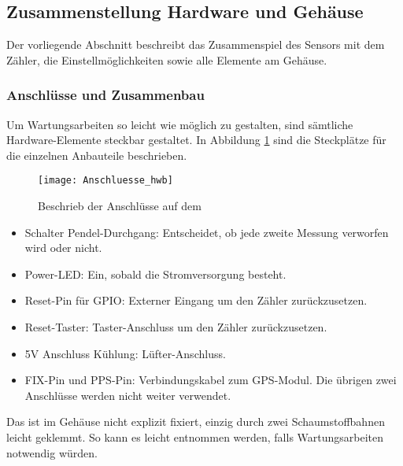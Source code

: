 \subsection{Zusammenstellung Hardware und Gehäuse}
\label{cap:housing}
Der vorliegende Abschnitt beschreibt das Zusammenspiel des Sensors mit dem Zähler, die Einstellmöglichkeiten sowie alle Elemente am Gehäuse.
\subsubsection{Anschlüsse und Zusammenbau}
Um Wartungsarbeiten so leicht wie möglich zu gestalten, sind sämtliche Hardware-Elemente steckbar gestaltet. In Abbildung \ref{fig:Anschluesse_hwb} sind die Steckplätze für die einzelnen Anbauteile beschrieben.
\begin{figure}[H]
	\centering
	\texttt{[image: Anschluesse\_hwb]}
	\caption{Beschrieb der Anschlüsse auf dem \hwb}
	\label{fig:Anschluesse_hwb}
\end{figure}
\begin{itemize}
	\item Schalter Pendel-Durchgang: Entscheidet, ob jede zweite Messung verworfen wird oder nicht.
	\item Power-LED: Ein, sobald die Stromversorgung besteht.
	\item Reset-Pin für GPIO: Externer Eingang um den Zähler zurückzusetzen.
	\item Reset-Taster: Taster-Anschluss um den Zähler zurückzusetzen.
	\item 5V Anschluss Kühlung: Lüfter-Anschluss.
	\item FIX-Pin und PPS-Pin: Verbindungskabel zum GPS-Modul. Die übrigen zwei Anschlüsse werden nicht weiter verwendet.
\end{itemize}
Das \hwb ist im Gehäuse nicht explizit fixiert, einzig durch zwei Schaumstoffbahnen leicht geklemmt. So kann es leicht entnommen werden, falls Wartungsarbeiten notwendig würden.
